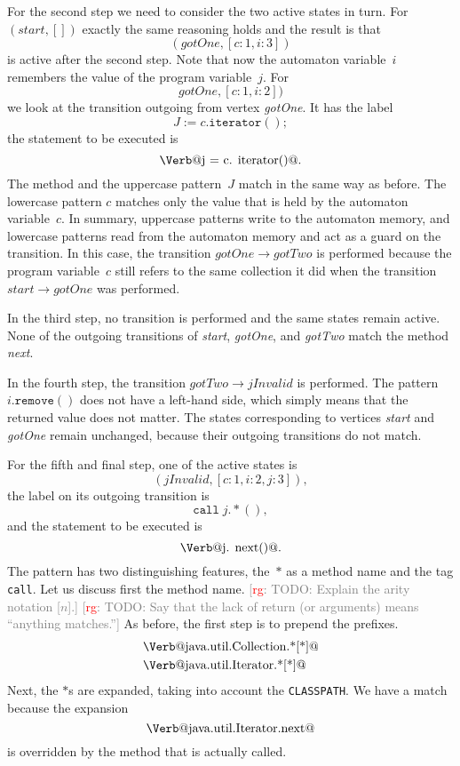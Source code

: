 \documentclass[preprint]{sigplanconf} %
\makeatletter
\newcommand{\note}[2]{\textcolor{gray}{[\textcolor{red}{#1}: #2]}}
\newcommand{\rg}[1]{\note{rg}{#1}}
\newcommand{\verbline}[2][]{\[\text{\Verb@#2@}#1\]}
\theoremstyle{definition}
\makeatother
\begin{document}
For the second step we need to consider the two active states in turn.
For $(\mathit{start},[])$ exactly the same reasoning holds and the result is that \[(\mathit{gotOne},[c:1,i:3])\] is active after the second step.
Note that now the automaton variable~$i$ remembers the value of the program variable~$j$.
For \[\mathit{gotOne},[c:1,i:2])\] we look at the transition outgoing from vertex \textit{gotOne}.
It has the label \[J:=c.\mathtt{iterator}();\]
the statement to be executed is \verbline[.]{j = c.\PY{n+na}{iterator}()}
The method and the uppercase pattern~$J$ match in the same way as before.
The lowercase pattern $c$ matches only the value that is held by the automaton variable~$c$.
In summary, uppercase patterns write to the automaton memory, and lowercase patterns read from the automaton memory and act as a guard on the transition.
In this case, the transition $\mathit{gotOne}\to\mathit{gotTwo}$ is performed because the program variable~$c$ still refers to the same collection it did when the transition $\mathit{start}\to\mathit{gotOne}$ was performed.

In the third step, no transition is performed and the same states remain active.
None of the outgoing transitions of \textit{start}, \textit{gotOne}, and \textit{gotTwo} match the method \textit{next}.

In the fourth step, the transition $\mathit{gotTwo}\to\mathit{jInvalid}$ is performed.
The pattern $i.\mathtt{remove}()$ does not have a left-hand side, which simply means that the returned value does not matter.
The states corresponding to vertices \textit{start} and \textit{gotOne} remain unchanged, because their outgoing transitions do not match.

For the fifth and final step, one of the active states is \[(\mathit{jInvalid},[c:1,i:2,j:3]),\] the label on its outgoing transition is \[\mathtt{call}\;j.{*}(),\] and the statement to be executed is \verbline[.]{j.\PY{n+na}{next}()}
The pattern has two distinguishing features, the~$*$ as a method name and the tag \texttt{call}.
Let us discuss first the method name.
\rg{TODO: Explain the arity notation [$n$].}
\rg{TODO: Say that the lack of return (or arguments) means ``anything matches.''}
As before, the first step is to prepend the prefixes.
\begin{align*}
&\text{\Verb@java.util.Collection.*[*]@} \\
&\text{\Verb@java.util.Iterator.*[*]@}
\end{align*}
Next, the $*$s are expanded, taking into account the \texttt{CLASSPATH}.
We have a match because the expansion \verbline{java.util.Iterator.next} is overridden by the method that is actually called.
\end{document}
